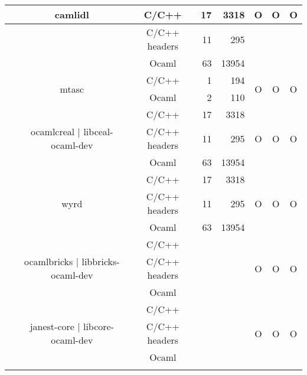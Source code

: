 \documentclass[11pt,a4paper]{article}
\begin{document}
\begin{table}[h,t]
\begin{tabular}{|>{\centering}m{3cm}| c|c|r|r| c| c|c|}
& \multirow{3}{*}{camlidl} & C/C++ & 17 & 3318 & \multirow{3}{*}{O} & \multirow{3}{*}{O} & \multirow{3}{*}{O}\\
 \cline{3-5}
 &  &                           C/C++ headers & 11 & 295 & & & \\
 \cline{3-5}
 & &                           Ocaml & 63 & 13954 & & & \\
 \cline{2-8}


 &\multirow{2}{*}{mtasc} & C/C++ & 1 & 194  & \multirow{2}{*}{O} & \multirow{2}{*}{O} &

 \multirow{2}{*}{O}\\
 \cline{3-5}   
 &                                  & Ocaml & 2 & 110  & & & \\       
 \cline{2-8}





& \multirow{3}{3cm}{ocamlcreal | libceal-ocaml-dev} & C/C++ & 17 & 3318 & \multirow{3}{*}{O} & \multirow{3}{*}{O} & \multirow{3}{*}{O}\\
 \cline{3-5}
 &  &                           C/C++ headers & 11 & 295 & & & \\
 \cline{3-5}
 & &                           Ocaml & 63 & 13954 & & & \\
 \cline{2-8}

& \multirow{3}{*}{wyrd} & C/C++ & 17 & 3318 & \multirow{3}{*}{O} & \multirow{3}{*}{O} & \multirow{3}{*}{O}\\
 \cline{3-5}
 &  &                           C/C++ headers & 11 & 295 & & & \\
 \cline{3-5}
 & &                           Ocaml & 63 & 13954 & & & \\
 \cline{2-8}


 &\multirow{3}{3cm}{ocamlbricks | libbricks-ocaml-dev} & C/C++ &  &  & \multirow{3}{*}{O} & \multirow{3}{*}{O} & \multirow{3}{*}{O}\\
 \cline{3-5}
 & &                           C/C++ headers &  &  & & & \\
 \cline{3-5}
 & &                          Ocaml &  &  & & & \\
 \cline{2-8}


 &\multirow{3}{3cm}{janest-core | libcore-ocaml-dev} & C/C++ &  &  & \multirow{3}{*}{O} & \multirow{3}{*}{O} & \multirow{3}{*}{O}\\
 \cline{3-5}
 & &                           C/C++ headers &  &  & & & \\
 \cline{3-5}
 & &                          Ocaml &  &  & & & \\
 \cline{2-8}



\end{tabular}
\end{table}
\end{document}
